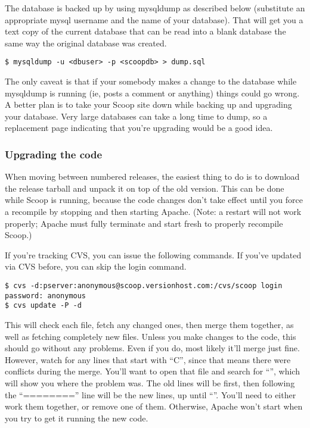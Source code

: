 The database is backed up by using mysqldump as described below (substitute an appropriate mysql username and the name of your database).  That will get you a text copy of the current database that can be read into a blank database the same way the original database was created.

\begin{verbatim}
$ mysqldump -u <dbuser> -p <scoopdb> > dump.sql
\end{verbatim}

The only caveat is that if your somebody makes a change to the database while mysqldump is running (ie, posts a comment or anything) things could go wrong.  A better plan is to take your Scoop site down while backing up and upgrading your database.  Very large databases can take a long time to dump, so a replacement page indicating that you're upgrading would be a good idea.

\subsubsection{Upgrading the code}
\label{upgrading-code}

When moving between numbered releases, the easiest thing to do is to download the release tarball and unpack it on top of the old version.  This can be done while Scoop is running, because the code changes don't take effect until you force a recompile by stopping and then starting Apache.  (Note: a restart will not work properly; Apache must fully terminate and start fresh to properly recompile Scoop.)

If you're tracking CVS, you can issue the following commands.  If you've updated via CVS before, you can skip the login command.

\begin{verbatim}
$ cvs -d:pserver:anonymous@scoop.versionhost.com:/cvs/scoop login
password: anonymous
$ cvs update -P -d
\end{verbatim}

This will check each file, fetch any changed ones, then merge them together, as well as fetching completely new files. Unless you make changes to the code, this should go without any problems. Even if you do, most likely it'll merge just fine. However, watch for any lines that start with ``C'', since that means there were conflicts during the merge. You'll want to open that file and search for ``\latexhtml{$<$}{<}{}\latexhtml{$<$}{<}{}\latexhtml{$<$}{<}{}\latexhtml{$<$}{<}{}\latexhtml{$<$}{<}'', which will show you where the problem was. The old lines will be first, then following the ``========'' line will be the new lines, up until ``\latexhtml{$>$}{>}{}\latexhtml{$>$}{>}{}\latexhtml{$>$}{>}{}\latexhtml{$>$}{>}{}\latexhtml{$>$}{>}{}\latexhtml{$>$}{>}''. You'll need to either work them together, or remove one of them. Otherwise, Apache won't start when you try to get it running the new code.

